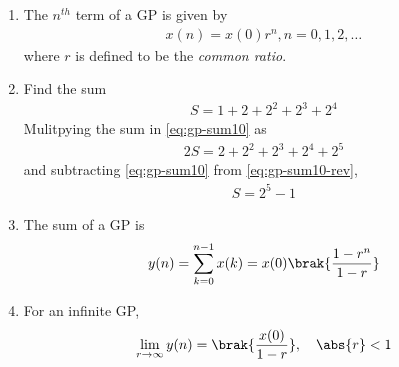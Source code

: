 \begin{enumerate}[label=\thesubsection.\arabic*,ref=\thesubsection.\theenumi]
	\item The $n^{th}$ term of a GP is given by 
\begin{align}
	\label{eq:gp-nthterm}
	x(n)= x(0)r^n, n = 0,1,2, \dots 
\end{align}
where $r$
		is defined to be the {\em common ratio}.
\item Find the sum 
\begin{align}
	\label{eq:gp-sum10}
	S = 1 + 2 + 2^2 + 2^3 + 2^4
\end{align}
	\solution
Mulitpying the sum in
	\eqref{eq:gp-sum10}
	as
\begin{align}
	\label{eq:gp-sum10-rev}
	2S =  2 + 2^2 + 2^3 + 2^4+ 2^5
\end{align}
and  subtracting
	\eqref{eq:gp-sum10}
	from
	\eqref{eq:gp-sum10-rev},
\begin{align}
	\label{eq:gp-sum10-add}
	S = 2^5 - 1
\end{align}
\item The sum of a GP is 
\begin{align}
	 y(n)=\sum_{k=0}^{n-1}x(k)  
	= x(0)\brak{\frac{1-r^{n}}{1-r}}
	\label{eq:gp-sumn}
\end{align}
\item  For an infinite GP, 
\begin{align}
	\lim_{r\to\infty}	y(n) = 
	 \brak{\frac{x(0)}{1-r}},\quad \abs{r} < 1
	\label{eq:gp-sumn-infty}
\end{align}
\end{enumerate}
